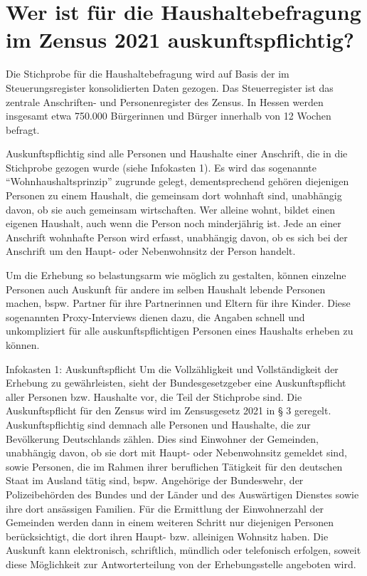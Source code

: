 \section{Wer ist für die Haushaltebefragung im Zensus 2021 auskunftspflichtig?}
Die Stichprobe für die Haushaltebefragung wird auf Basis der im Steuerungsregister konsolidierten Daten gezogen. Das Steuerregister ist das zentrale Anschriften- und Personenregister des Zensus. In Hessen werden insgesamt etwa 750.000 Bürgerinnen und Bürger innerhalb von 12 Wochen befragt.\par Auskunftspflichtig sind alle Personen und Haushalte einer Anschrift, die in die Stichprobe gezogen wurde (siehe Infokasten 1). Es wird das sogenannte ``Wohnhaushaltsprinzip'' zugrunde gelegt, dementsprechend gehören diejenigen Personen zu einem Haushalt, die gemeinsam dort wohnhaft sind, unabhängig davon, ob sie auch gemeinsam wirtschaften. Wer alleine wohnt, bildet einen eigenen Haushalt, auch wenn die Person noch minderjährig ist. Jede an einer Anschrift wohnhafte Person wird erfasst, unabhängig davon, ob es sich bei der Anschrift um den Haupt- oder Nebenwohnsitz der Person handelt.\par
Um die Erhebung so belastungsarm wie möglich zu gestalten, können einzelne Personen auch Auskunft für andere im selben Haushalt lebende Personen machen, bspw. Partner für ihre Partnerinnen und Eltern für ihre Kinder. Diese sogenannten Proxy-Interviews dienen dazu, die Angaben schnell und unkompliziert für alle auskunftspflichtigen Personen eines Haushalts erheben zu können.\par

\begin{myblock}{Infokasten 1: Auskunftspflicht}
Um die Vollzähligkeit und Vollständigkeit der Erhebung zu gewährleisten, sieht der Bundesgesetzgeber eine Auskunftspflicht aller Personen bzw. Haushalte vor, die Teil der Stichprobe sind. Die Auskunftspflicht für den Zensus wird im Zensusgesetz 2021 in § 3 geregelt. Auskunftspflichtig sind demnach alle Personen und Haushalte, die zur Bevölkerung Deutschlands zählen. Dies sind Einwohner der Gemeinden, unabhängig davon, ob sie dort mit Haupt- oder Nebenwohnsitz gemeldet sind, sowie Personen, die im Rahmen ihrer beruflichen Tätigkeit für den deutschen Staat im Ausland tätig sind, bspw. Angehörige der Bundeswehr, der Polizeibehörden des Bundes und der Länder und des Auswärtigen Dienstes sowie ihre dort ansässigen Familien. Für die Ermittlung der Einwohnerzahl der Gemeinden werden dann in einem weiteren Schritt nur diejenigen Personen berücksichtigt, die dort ihren Haupt- bzw. alleinigen Wohnsitz haben. Die Auskunft kann elektronisch, schriftlich, mündlich oder telefonisch erfolgen, soweit diese Möglichkeit zur Antworterteilung von der Erhebungsstelle angeboten wird.
\end{myblock}
